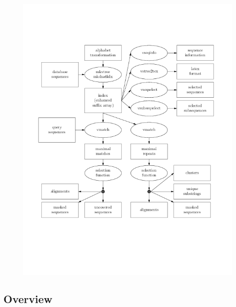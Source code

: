 \documentclass[12pt,titlepage]{article}
\begin{document}
\begin{AboutVmatch}
\begin{figure}
\begin{htmlonly}
\includegraphics{Dataflow.png}
\end{htmlonly}
\end{figure}

\subsection*{Overview}


\end{AboutVmatch}
\end{document}
